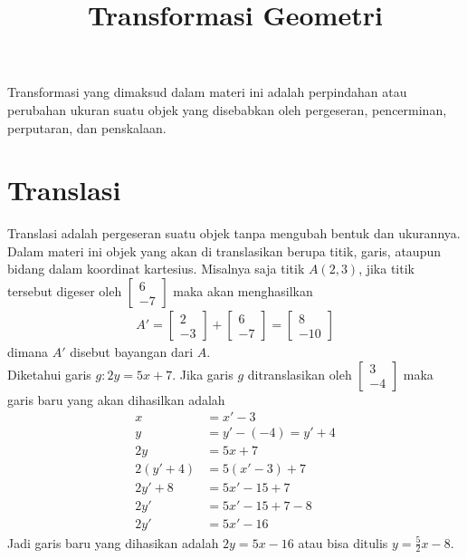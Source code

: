 \documentclass{article}
\title{\textbf{Transformasi Geometri}}
\begin{document}
\onehalfspacing
\maketitle

Transformasi yang dimaksud dalam materi ini adalah perpindahan atau perubahan ukuran suatu objek yang disebabkan oleh pergeseran, pencerminan, perputaran, dan penskalaan.

\section{Translasi}
Translasi adalah pergeseran suatu objek tanpa mengubah bentuk dan ukurannya. Dalam materi ini objek yang akan di translasikan berupa titik, garis, ataupun bidang dalam koordinat kartesius. Misalnya saja titik $A(2,3)$, jika titik tersebut digeser oleh $\begin{bmatrix}
    6\\-7
\end{bmatrix}$ maka akan menghasilkan
\[
\begin{aligned}
A'=
    \begin{bmatrix}
        2\\-3
    \end{bmatrix}+\begin{bmatrix}
        6\\-7
    \end{bmatrix}=\begin{bmatrix}
        8\\-10
    \end{bmatrix}
\end{aligned}
\]
dimana $A'$ disebut bayangan dari $A$.\\
Diketahui garis $g:2y=5x+7$. Jika garis $g$ ditranslasikan oleh $\begin{bmatrix}
    3\\-4
\end{bmatrix}$ maka garis baru yang akan dihasilkan adalah\\
\[\begin{aligned}
    x&=x'-3\\
    y&=y'-(-4)=y'+4\\
    2y&=5x+7\\
    2(y'+4)&=5(x'-3)+7\\
    2y'+8&=5x'-15+7\\
    2y'&=5x'-15+7-8\\
    2y'&=5x'-16
\end{aligned}\]
Jadi garis baru yang dihasikan adalah $2y=5x-16$ atau bisa ditulis $\displaystyle y=\frac{5}{2}x-8$.\\
\end{document}
